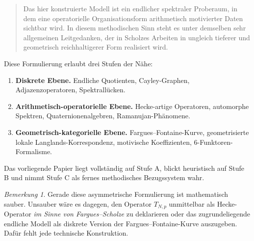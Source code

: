 \documentclass[12pt,a4paper]{article}
\theoremstyle{plain}
\theoremstyle{definition}
\theoremstyle{remark}
\newtheorem{bemerkung}[satz]{Bemerkung}
\newcommand{\TNp}{T_{N,p}}
\begin{document}
\begin{quote}
Das hier konstruierte Modell ist ein endlicher spektraler Proberaum, in dem eine operatorielle Organisationsform arithmetisch motivierter Daten sichtbar wird. In diesem methodischen Sinn steht es unter demselben sehr allgemeinen Leitgedanken, der in Scholzes Arbeiten in ungleich tieferer und geometrisch reichhaltigerer Form realisiert wird.
\end{quote}

Diese Formulierung erlaubt drei Stufen der Nähe:
\begin{enumerate}[label=\textbf{Stufe \Alph*.}]
\item \textbf{Diskrete Ebene.} Endliche Quotienten, Cayley-Graphen, Adjazenzoperatoren, Spektrallücken.
\item \textbf{Arithmetisch-operatorielle Ebene.} Hecke-artige Operatoren, automorphe Spektren, Quaternionenalgebren, Ramanujan-Phänomene.
\item \textbf{Geometrisch-kategorielle Ebene.} Fargues--Fontaine-Kurve, geometrisierte lokale Langlands-Korrespondenz, motivische Koeffizienten, 6-Funktoren-Formalisme.
\end{enumerate}

Das vorliegende Papier liegt vollständig auf Stufe A, blickt heuristisch auf Stufe B und nimmt Stufe C als fernes methodisches Bezugssystem wahr.

\begin{bemerkung}
Gerade diese asymmetrische Formulierung ist mathematisch sauber. Unsauber wäre es dagegen, den Operator \(\TNp\) unmittelbar als Hecke-Operator \emph{im Sinne von Fargues--Scholze} zu deklarieren oder das zugrundeliegende endliche Modell als diskrete Version der Fargues--Fontaine-Kurve auszugeben. Dafür fehlt jede technische Konstruktion.
\end{bemerkung}
\end{document}
